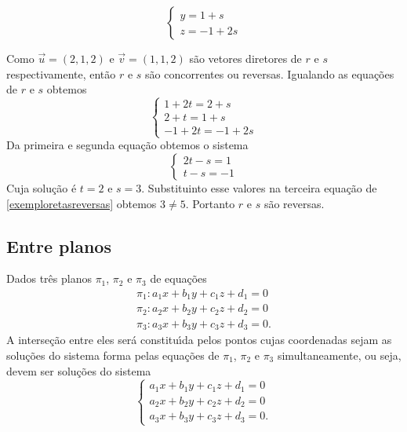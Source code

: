 \begin{exemplos}
\begin{enumerate}
\[\begin{cases}
                y = 1 + s\\
                z = -1 + 2s
            \end{cases}
        \]
        \begin{solucao}
            Como $\vec{u} = (2,1,2)$ e $\vec{v} = (1,1,2)$ s\~ao vetores diretores de $r$ e $s$ respectivamente, ent\~ao $r$ e $s$ s\~ao concorrentes ou reversas. Igualando as equa\c{c}\~oes de $r$ e $s$ obtemos
            \begin{equation}\label{exemploretasreversas}
                \begin{cases}
                    1 + 2t = 2 + s\\
                    2 + t = 1 + s\\
                    -1 + 2t = -1 + 2s    
                \end{cases}
            \end{equation}
            Da primeira e segunda equa\c{c}\~ao obtemos o sistema
            \[
                \begin{cases}
                    2t - s = 1\\
                    t - s = -1
                \end{cases}
            \]
            Cuja solu\c{c}\~ao \'e $t = 2$ e $s = 3$. Substituinto esse valores na terceira equa\c{c}\~ao de \eqref{exemploretasreversas} obtemos $3 \ne 5$. Portanto $r$ e $s$ s\~ao reversas.
        \end{solucao}
    \end{enumerate}
\end{exemplos}

\subsection{Entre planos} %
\label{sub:entre_planos}
Dados tr\^es planos $\pi_1$, $\pi_2$ e $\pi_3$ de equa\c{c}\~oes
\begin{align*}
    \pi_1 : a_1x + b_1y + c_1z + d_1 = 0\\
    \pi_2 : a_2x + b_2y + c_2z + d_2 = 0\\
    \pi_3 : a_3x + b_3y + c_3z + d_3 = 0.
\end{align*}
A interse\c{c}\~ao entre eles ser\'a constitu{\'\i}da pelos pontos cujas coordenadas sejam as solu\c{c}\~oes do sistema forma pelas equa\c{c}\~oes de $\pi_1$, $\pi_2$ e $\pi_3$ simultaneamente, ou seja, devem ser solu\c{c}\~oes do sistema
\[
    \begin{cases}
        a_1x + b_1y + c_1z + d_1 = 0\\
        a_2x + b_2y + c_2z + d_2 = 0\\
        a_3x + b_3y + c_3z + d_3 = 0.
    \end{cases}
\]


